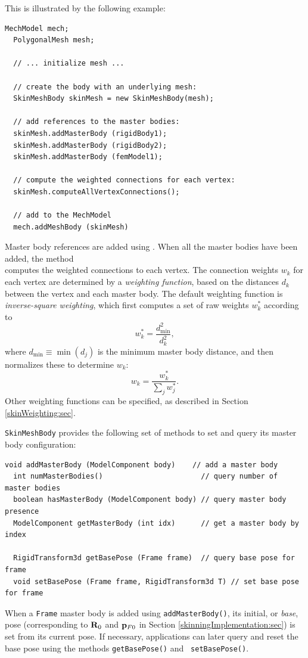 This is illustrated by the following example:
%
\begin{lstlisting}[]
  MechModel mech;
  PolygonalMesh mesh;

  // ... initialize mesh ...

  // create the body with an underlying mesh:
  SkinMeshBody skinMesh = new SkinMeshBody(mesh);
 
  // add references to the master bodies:
  skinMesh.addMasterBody (rigidBody1);
  skinMesh.addMasterBody (rigidBody2);
  skinMesh.addMasterBody (femModel1);
 
  // compute the weighted connections for each vertex:
  skinMesh.computeAllVertexConnections();

  // add to the MechModel
  mech.addMeshBody (skinMesh)
\end{lstlisting}
%
Master body references are added using
.
When all the master bodies have been added, the method\\
computes the weighted connections to each vertex.  The connection
weights $w_k$ for each vertex are determined by a {\it weighting
function}, based on the distances $d_k$ between the vertex and each
master body. The default weighting function is {\it inverse-square
weighting}, which first computes a set of raw weights $w_k^*$
according to
%
\begin{equation}
w_k^* = \frac{d_\text{min}^2}{d_k^2},
\label{inverseSquareWeights:eqn}
\end{equation}
%
where $d_\text{min} \equiv \min( d_j)$ is the minimum master body distance,
and then normalizes these to determine $w_k$:
%
\begin{equation}
w_k = \frac{w^*_k}{\sum_j w^*_j}.
\label{normalizeWeights:eqn}
\end{equation}
%
Other weighting functions can be specified, as described in Section
\ref{skinWeighting:sec}.

{\tt SkinMeshBody} provides the following set of methods to set and
query its master body configuration:
%
\begin{lstlisting}[]
  void addMasterBody (ModelComponent body)    // add a master body
  int numMasterBodies()                       // query number of master bodies
  boolean hasMasterBody (ModelComponent body) // query master body presence
  ModelComponent getMasterBody (int idx)      // get a master body by index

  RigidTransform3d getBasePose (Frame frame)  // query base pose for frame
  void setBasePose (Frame frame, RigidTransform3d T) // set base pose for frame
\end{lstlisting}
%
When a {\tt Frame} master body is added using {\tt addMasterBody()},
its initial, or {\it base}, pose (corresponding to ${\bf R}_0$ and
${\bf p}_{F0}$ in Section \ref{skinningImplementation:sec}) is set from its
current pose.  If necessary, applications can later query and reset
the base pose using the methods {\tt getBasePose()} and {\tt
setBasePose()}.

